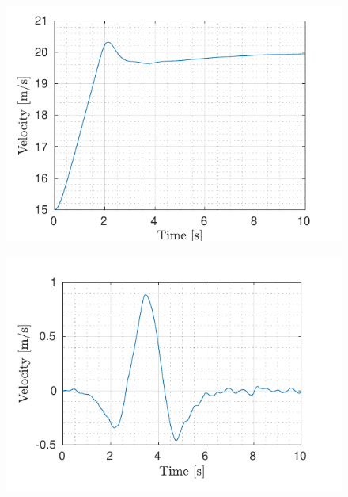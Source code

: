 \begin{figure}[!h]
	\centering
	\begin{minipage}[t]{0.49\textwidth}
		\includegraphics[width=\textwidth]{../../MATLAB/lane_following_curve/figure/LongitudinalVelocityVsTime_curve.pdf}
		\label{fig:longitudinal_velocity_laneFollowing_curve}
	\end{minipage}
	\begin{minipage}[t]{0.49\textwidth}
		\includegraphics[width=\textwidth]{../../MATLAB/lane_following_curve/figure/LateralVelocityVsTime_curve.pdf}
		\label{fig:lateral_velocity_laneFollowing_curve}
	\end{minipage}
	\begin{minipage}[t]{0.49\textwidth}

\end{minipage}
\end{figure}
